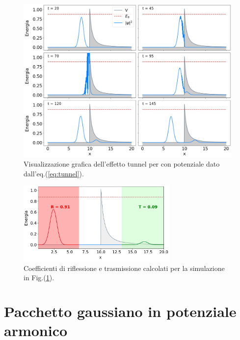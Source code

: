 \documentclass[12pt]{report}
\begin{document}
\begin{figure}
    \centering
    \includegraphics[width = \textwidth]{immagini/tunnel.png}
    \caption{ \textcolor{dark-gray}{Visualizzazione grafica dell'effetto tunnel per con potenziale dato dall'eq.(\ref{eq:tunnel}).}}
    \label{fig:tunnel}
\end{figure}
\begin{figure}
    \centering
    \includegraphics[width = 0.7\textwidth]{immagini/RT_tunnel.png}
    \caption{ \textcolor{dark-gray}{Coefficienti di riflessione e trasmissione calcolati per la simulazione in Fig.(\ref{fig:tunnel}). %
    }}
    \label{fig:RT_tunnel}
\end{figure}



\section{Pacchetto gaussiano in potenziale armonico}
\label{sec:Wp_arm}
\end{document}
